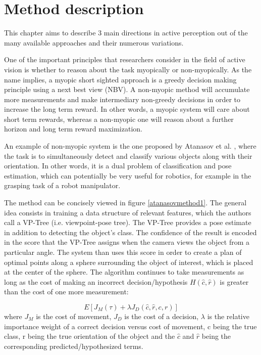 \documentclass[a4paper,11pt,english]{article}
\begin{document}
\section{Method description}
This chapter aims to describe 3 main directions in active perception out of the many available approaches and their numerous variations. 

One of the important principles that researchers consider in the field of active vision is whether to reason about the task myopically or non-myopically. As the name implies, a myopic short sighted approach is a greedy decision making principle using a next best view (NBV). A non-myopic method will accumulate more measurements and make intermediary non-greedy decisions in order to increase the long term reward. In other words, a myopic system will care about short term rewards, whereas a non-myopic one will reason about a further horizon and long term reward maximization.  

An example of non-myopic system is the one proposed by Atanasov et al. \cite{atanasov2014nonmyopic}, where the task is to simultaneously detect and classify various objects along with their orientation. In other words, it is a dual problem of classification and pose estimation, which can potentially be very useful for robotics, for example in the grasping task of a robot manipulator. 

The method can be concisely viewed in figure \ref{atanasovmethod1}. The general idea consists in training a data structure of relevant features, which the authors call a VP-Tree (i.e. viewpoint-pose tree). The VP-Tree provides a pose estimate in addition to detecting the object's class. The confidence of the result is encoded in the score that the VP-Tree assigns when the camera views the object from a particular angle. The system than uses this score in order to create a plan of optimal points along a sphere surrounding the object of interest, which is placed at the center of the sphere. The algorithm continues to take measurements as long as the cost of making an incorrect decision/hypothesis $H(\hat{c}, \hat{r})$ is greater than the cost of one more measurement:

$$ E[J_M(\tau) + \lambda J_D(\hat{c},\hat{r},c,r)] $$
where $J_M$ is the cost of movement, $J_D$ is the cost of a decision, $\lambda$ is the relative importance weight of a correct decision versus cost of movement, c being the true class, r being the true orientation of the object and the $\hat{c}$ and $\hat{r}$ being the corresponding predicted/hypothesized terms.
\end{document}
